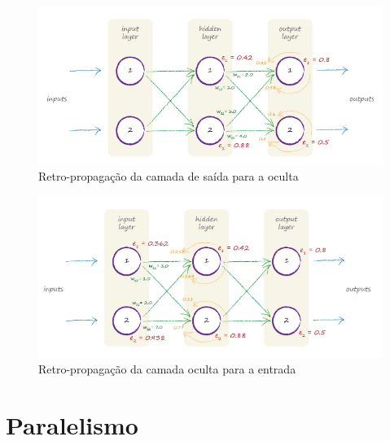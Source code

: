 \begin{apendicesenv}
		\begin{figure}[H]
			\centering
			\caption{Retro-propagação da camada de saída para a oculta}
			\label{fig:backpropagationerros1}
			\includegraphics[width=0.7\linewidth]{images/TEMPbackpropagationErros1}
		\end{figure}
		
		
		\begin{figure}[H]
			\centering
			\caption{Retro-propagação da camada oculta para a entrada}
			\label{fig:backpropagationerros2}
			\includegraphics[width=0.7\linewidth]{images/TEMPbackpropagationErros2}
		\end{figure}
		
	\chapter{Paralelismo}
		\par 
		
		
\end{apendicesenv}









